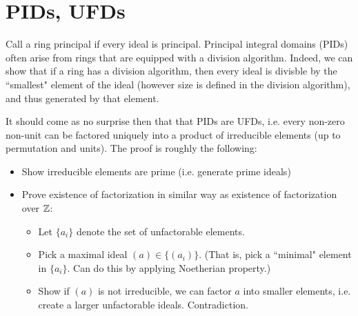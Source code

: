 \section{PIDs, UFDs}
Call a ring principal if every ideal is principal. Principal integral domains (PIDs) often arise from rings that are equipped with a division algorithm. Indeed, we can show that if a ring has a division algorithm, then every ideal is divisble by the ``smallest" element of the ideal (however size is defined in the division algorithm), and thus generated by that element.

It should come as no surprise then that that PIDs are UFDs, i.e. every non-zero non-unit can be factored uniquely into a product of irreducible elements (up to permutation and units). The proof is roughly the following:
\begin{itemize}
    \item Show irreducible elements are prime (i.e. generate prime ideals)
    \item Prove existence of factorization in similar way as existence of factorization over ${\mathbb Z}$:
        \begin{itemize}
            \item Let $\{a_i\}$ denote the set of unfactorable elements.
            \item Pick a maximal ideal $(a) \in \{(a_i)\}$. (That is, pick a ``minimal" element in $\{a_i\}$. Can do this by applying Noetherian property.)
            \item Show if $(a)$ is not irreducible, we can factor $a$ into smaller elements, i.e. create a larger unfactorable ideals. Contradiction.
        \end{itemize}
\end{itemize}
